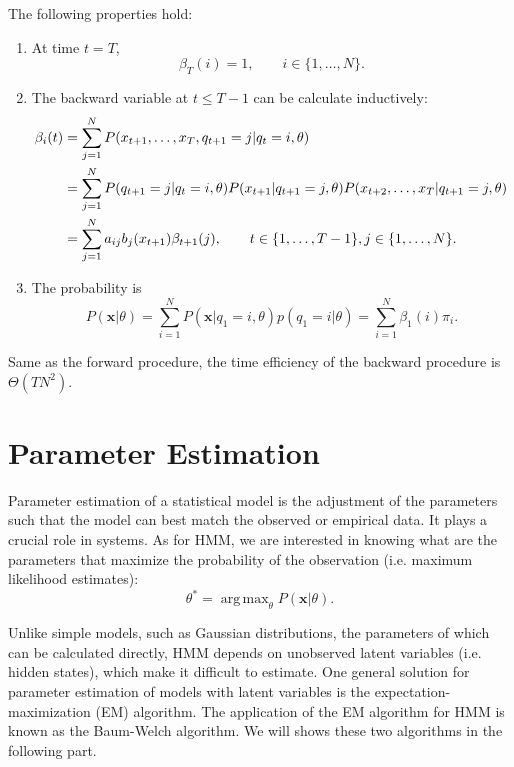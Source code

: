 \documentclass[12pt,final,twoside]{report}
\theoremstyle{plain}
\theoremstyle{definition}
\theoremstyle{remark}
\DeclareMathOperator*{\argmax}{arg\,max}
\begin{document}
The following properties hold:
\begin{enumerate}
  \item At time $t = T$,
    \begin{equation}
      \beta_T(i) = 1, \qquad i \in \{1,\dots,N\} .
    \end{equation}
  \item The backward variable at $t \leq T - 1$ can be calculate inductively:
    \begin{align}
      \beta_i(t) &= \sum_{j=1}^{N} P(x_{t+1},\dots,x_T,q_{t+1}=j|q_t=i,\theta) \notag\\
      &= \sum_{j=1}^{N} P(q_{t+1}=j|q_t=i,\theta) P(x_{t+1}|q_{t+1}=j,\theta) P(x_{t+2},\dots,x_T|q_{t+1}=j,\theta) \notag\\
      &= \sum_{j=1}^{N} a_{ij} b_j(x_{t+1}) \beta_{t+1}(j) , \qquad t \in \{1,\dots,T - 1\}, j \in \{1,\dots,N\} .
    \end{align}
  \item The probability is
    \begin{equation}
      P(\mathbf{x}|\theta) = \sum_{i=1}^N P(\mathbf{x}|q_1=i,\theta) p(q_1=i|\theta) = \sum_{i=1}^N \beta_1(i) \pi_i .
    \end{equation}
\end{enumerate}

Same as the forward procedure, the time efficiency of the backward procedure is $\Theta(TN^2)$.

\section{Parameter Estimation}
Parameter estimation of a statistical model is the adjustment of the parameters such that the model can best match the observed or empirical data. It plays a crucial role in systems. As for HMM, we are interested in knowing what are the parameters that maximize the probability of the observation (i.e. maximum likelihood estimates):
\begin{equation}
  \theta^* = \argmax_{\theta} P(\mathbf{x}|\theta) .
\end{equation}

Unlike simple models, such as Gaussian distributions, the parameters of which can be calculated directly, HMM depends on unobserved latent variables (i.e. hidden states), which make it difficult to estimate. One general solution for parameter estimation of models with latent variables is the expectation-maximization (EM) algorithm. The application of the EM algorithm for HMM is known as the Baum-Welch algorithm. We will shows these two algorithms in the following part.
\end{document}
